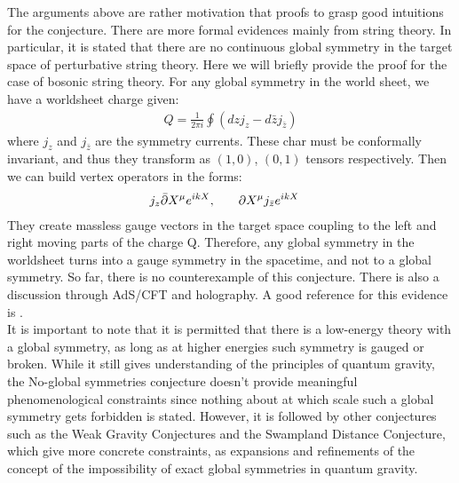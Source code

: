 \indent The arguments above are rather motivation that proofs to grasp good intuitions for the conjecture. There are more formal evidences mainly from string theory. In particular, it is stated that there are no continuous global symmetry in the target space of perturbative string theory. Here we will briefly provide the proof for the case of bosonic string theory. For any global symmetry in the world sheet, we have a worldsheet charge given:
\begin{align}
    Q = \frac{1}{2\pi i} \oint (dzj_{z} - d\bar{z} j_{\bar{z}})
\end{align}
where $j_{z}$ and $j_{\bar{z}}$ are the symmetry currents. These char must be conformally invariant, and thus they transform as $(1,0)$, $(0,1)$ tensors respectively. Then we can build vertex operators in the forms:
\begin{align}
    j_{z}\bar{\partial} X^{\mu}e^{ikX} ,& \qq{} \partial X^{\mu} j_{\bar{z}}e^{ikX}
\end{align}
They create massless gauge vectors in the target space coupling to the left and right moving parts of the charge Q. Therefore, any global symmetry in the worldsheet turns into a gauge symmetry in the spacetime, and not to a global symmetry. So far, there is no counterexample of this conjecture. There is also a discussion through AdS/CFT and holography. A good reference for this evidence is . \\
\indent It is important to note that it is permitted that there is a low-energy theory with a global symmetry, as long as at higher energies such symmetry is gauged or broken. While it still gives understanding of the principles of quantum gravity, the No-global symmetries conjecture doesn't provide meaningful phenomenological constraints since nothing about at which scale such a global symmetry gets forbidden is stated. However, it is followed by other conjectures such as the Weak Gravity Conjectures and the Swampland Distance Conjecture, which give more concrete constraints, as expansions and refinements of the concept of the impossibility of exact global symmetries in quantum gravity. 



